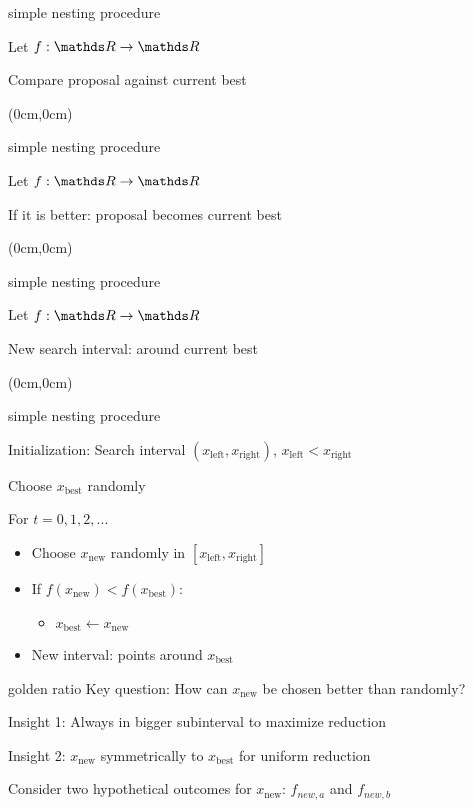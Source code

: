 \documentclass[11pt,compress,t,notes=noshow, xcolor=table]{beamer}
\newcommand{\xleft}{x_{\text{left}}} %
\newcommand{\xright}{x_{\text{right}}} %
\newcommand{\xnew}{x_{\text{new}}} %
\newcommand{\xbest}{x_{\text{best}}} %
\begin{document}
\begin{framei}{simple nesting procedure}
\item Let $f: \R \to \R$
\item Compare proposal against current best
\begin{textblock*}{\linewidth}(0cm,0cm)
\end{textblock*}
\end{framei}

\begin{framei}{simple nesting procedure}
\item Let $f: \R \to \R$
\item If it is better: proposal becomes current best
\begin{textblock*}{\linewidth}(0cm,0cm)
\end{textblock*}
\end{framei}

\begin{framei}{simple nesting procedure}
\item Let $f: \R \to \R$
\item New search interval: around current best
\begin{textblock*}{\linewidth}(0cm,0cm)
\end{textblock*}
\end{framei}

\begin{framei}{simple nesting procedure}
\item Initialization: Search interval  $(\xleft, \xright)$, $\xleft < \xright$
\item Choose $\xbest$ randomly
\item For $t = 0, 1, 2, ...$
\begin{itemize}
\item Choose $\xnew$ randomly in $[\xleft, \xright]$
\item If $f(\xnew) < f(\xbest)$:
\begin{itemize}
\item $\xbest \leftarrow \xnew$
\end{itemize}
\item New interval: points around $\xbest$
\end{itemize}
\end{framei}

\begin{frame2}{golden ratio}
Key question: How can $\xnew$ be chosen better than randomly? 
\begin{itemizeM}
\item Insight 1: Always in bigger subinterval to maximize reduction
\item Insight 2: $\xnew$ symmetrically to $\xbest$ for uniform reduction
\end{itemizeM}
\vspace{-1cm}
Consider two hypothetical outcomes for $\xnew$: $f_{new, a}$ and $f_{new, b}$
\end{frame2}
\end{document}
